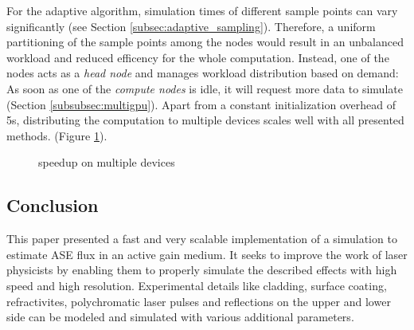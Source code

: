 For the adaptive algorithm, simulation times of different sample points can vary
significantly (see Section \ref{subsec:adaptive_sampling}). Therefore, a uniform
partitioning of the sample points among the nodes would result in an unbalanced
workload and reduced efficency for the whole computation. Instead, one of the
nodes acts as a \emph{head node} and manages workload distribution based on demand: As
soon as one of the \emph{compute nodes} is idle, it will request more data to
simulate (Section \ref{subsubsec:multigpu}).
Apart from a constant initialization overhead of 5s, distributing the computation to
multiple devices scales well with all presented methods. (Figure
\ref{plot:gpu_scaling}).
\begin{figure}[H]
  \centerline{
    }
  \caption{speedup on multiple devices}
  \label{plot:gpu_scaling}
\end{figure}

\subsection{Conclusion}
\label{subsec:conclusion}
This paper presented a fast and very scalable implementation of a simulation to
estimate ASE flux in an active gain medium. It seeks to improve the work of
laser physicists by enabling them to properly simulate the described effects
with high speed and high resolution. Experimental details like cladding, surface
coating, refractivites, polychromatic laser pulses and reflections on the upper
and lower side can be modeled and simulated with various additional parameters.


